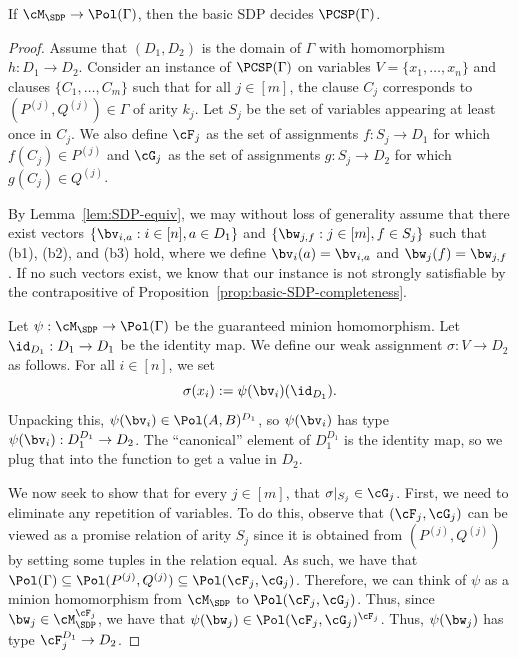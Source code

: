 \begin{theorem}\label{thm:hom_to_alg}
If $\cM_{\SDP} \to \Pol({\Gamma})$, then the basic SDP decides $\PCSP({\Gamma})$.
\end{theorem}
{
\begin{proof}
Assume that $(D_1, D_2)$ is the domain of $\Gamma$ with homomorphism $h : D_1 \to D_2$. Consider an instance of $\PCSP(\Gamma)$ on variables $V = \{x_1, \hdots, x_n\}$ and clauses $\{C_1, \hdots, C_m\}$ such that for all $j \in [m]$, the clause $C_j$ corresponds to $(P^{(j)}, Q^{(j)}) \in \Gamma$ of arity $k_j$. Let $S_j$ be the set of variables appearing at least once in $C_j$. We also define $\cF_j$ as the set of assignments $f : S_j \to D_1$ for which $f(C_j) \in P^{(j)}$ and $\cG_j$ as the set of assignments $g : S_j \to D_2$ for which $g(C_j) \in Q^{(j)}$.

By Lemma~\ref{lem:SDP-equiv}, we may without loss of generality assume that there exist vectors $\{\bv_{i,a} : i \in [n], a \in D_1\}$ and $\{\bw_{j,f} : j \in [m], f \in S_j\}$ such that (b1), (b2), and (b3) hold, where we define $\bv_i(a) = \bv_{i,a}$ and $\bw_j(f) = \bw_{j,f}$.
If no such vectors exist, we know that our instance is not strongly satisfiable by the contrapositive of Proposition~\ref{prop:basic-SDP-completeness}.

Let $\psi : \cM_{\SDP} \to \Pol(\Gamma)$ be the guaranteed minion homomorphism. Let $\id_{D_1} : D_1 \to D_1$ be the identity map. We define our weak assignment $\sigma : V \to D_2$ as follows. For all $i \in [n]$, we set
\[
    \sigma(x_i) := \psi(\bv_i)(\id_{D_1}).
\]
Unpacking this, $\psi(\bv_i) \in \Pol(A, B)^{D_1}$, so $\psi(\bv_i)$ has type $\psi(\bv_i) : D_1^{D_1} \to D_2$. The ``canonical'' element of $D_1^{D_1}$ is the identity map, so we plug that into the function to get a value in $D_2$.

We now seek to show that for every $j \in [m]$, that $\sigma|_{S_j} \in \cG_j$. First, we need to eliminate any repetition of variables. To do this, observe that $(\cF_j, \cG_j)$ can be viewed as a promise relation of arity $S_j$ since it is obtained from $(P^{(j)}, Q^{(j)})$ by setting some tuples in the relation equal. As such, we have that $\Pol({\Gamma}) \subseteq \Pol(P^{(j)}, Q^{(j)}) \subseteq \Pol(\cF_j, \cG_j)$. Therefore, we can think of $\psi$ as a minion homomorphism from $\cM_{\SDP}$ to $\Pol(\cF_j, \cG_j)$. Thus, since $\bw_j \in \cM_{\SDP}^{\cF_j}$, we have that $\psi(\bw_j) \in \Pol(\cF_j, \cG_j)^{\cF_j}$. Thus, $\psi(\bw_j)$ has type $\cF_j^{D_1} \to D_2$.


\end{proof}}
